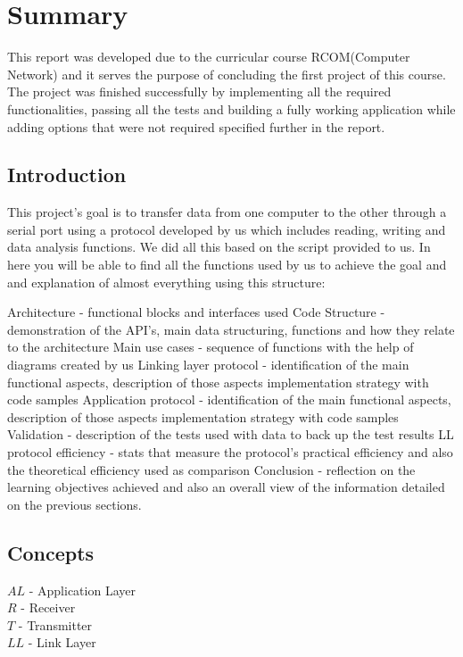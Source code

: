 \documentclass[contents.tex]{subfiles}
\begin{document}
\section{Summary}
\label{sec:summary}
   
This report was developed due to the curricular course RCOM(Computer Network) and it serves the purpose of concluding the first project of this course.
The project was finished successfully by implementing all the required functionalities, passing all the tests and building a fully working application while adding options that were not required specified further in the report.

\subsection{Introduction}
\label{subsec:intro}

This project’s goal is to transfer data from one computer to the other through a serial port using a protocol developed by us which includes reading, writing and data analysis functions.
We did all this based on the script provided to us.
In here you will be able to find all the functions used by us to achieve the goal and and explanation of almost everything using this structure:

Architecture - functional blocks and interfaces used
Code Structure - demonstration of the API’s, main data structuring, functions and how they relate to the architecture
Main use cases - sequence of functions with the help of diagrams created by us
Linking layer protocol - identification of the main functional aspects, description of those aspects implementation strategy with code samples
Application protocol - identification of the main functional aspects, description of those aspects implementation strategy with code samples
Validation - description of the tests used with data to back up the test results
LL protocol efficiency - stats that measure the protocol’s practical efficiency and also the theoretical efficiency used as comparison
Conclusion - reflection on the learning objectives achieved and also an overall view of the information detailed on the previous sections.

\subsection{Concepts}
\label{subsec:concepts}

$AL$ - Application Layer\\
$R$ - Receiver\\
$T$ - Transmitter\\
$LL$ - Link Layer\\
\end{document}
